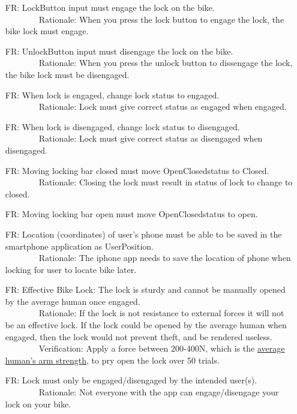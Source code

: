\documentclass[12pt]{article}
\newcounter{reqnum} %
\begin{document}
\begin{itemize}
\setlength{\itemindent}{.5in}
\item[FR\refstepcounter{reqnum}\thereqnum\label{FR1}:] LockButton input must engage the lock on the bike.
\\ \-\ \-\ \-\ \-\ \-\ \-\ \-\ \-\ Rationale: When you press the lock button to engage the lock, the bike lock must engage.
\item[FR\refstepcounter{reqnum}\thereqnum\label{FR2}:] UnlockButton input must disengage the lock on the bike.
\\ \-\ \-\ \-\ \-\ \-\ \-\ \-\ \-\ Rationale: When you press the unlock button to dissengage the lock, the bike lock must be disengaged.
\item[FR\refstepcounter{reqnum}\thereqnum\label{FR3}:] When lock is engaged, change lock status to engaged.
\\ \-\ \-\ \-\ \-\ \-\ \-\ \-\ \-\ Rationale: Lock must give correct status as engaged when engaged.
\item[FR\refstepcounter{reqnum}\thereqnum\label{FR4}:] When lock is disengaged, change lock status to disengaged.
\\ \-\ \-\ \-\ \-\ \-\ \-\ \-\ \-\ Rationale: Lock must give correct status as disengaged when disengaged.
\item[FR\refstepcounter{reqnum}\thereqnum\label{FR5}:] Moving locking bar closed must move OpenClosedstatus to Closed.
\\ \-\ \-\ \-\ \-\ \-\ \-\ \-\ \-\ Rationale: Closing the lock must result in status of lock to change to closed.
\item[FR\refstepcounter{reqnum}\thereqnum\label{FR6}:] Moving locking bar open must move OpenClosedstatus to open.
\item[FR\refstepcounter{reqnum}\thereqnum\label{FR7}:] Location (coordinates) of user’s phone must be able to be saved in the smartphone application as UserPosition.
\\ \-\ \-\ \-\ \-\ \-\ \-\ \-\ \-\ Rationale: The iphone app needs to save the location of phone when locking for user to locate bike later.
\item[FR\refstepcounter{reqnum}\thereqnum\label{FR8}:] Effective Bike Lock: The lock is sturdy and cannot be manually opened by the average human once engaged.
\\ \-\ \-\ \-\ \-\ \-\ \-\ \-\ \-\ Rationale: If the lock is not resistance to external forces it will not be an effective lock. If the lock could be opened by the average human when engaged, then the lock would not prevent theft, and be rendered useless.
\\ \-\ \-\ \-\ \-\ \-\ \-\ \-\ \-\ Verification: Apply a force between 200-400N, which is the \href{https://www.tandfonline.com/doi/pdf/10.1080/10803548.2004.11076594?cookieSet=1}{average human's arm strength}, to pry open the lock over 50 trials. 
\item[FR\refstepcounter{reqnum}\thereqnum\label{FR9}:] Lock must only be engaged/disengaged by the intended user(s).
\\ \-\ \-\ \-\ \-\ \-\ \-\ \-\ \-\ Rationale: Not everyone with the app can engage/disengage your lock on your bike.
\end{itemize}
\end{document}
